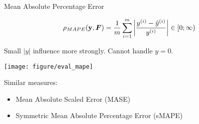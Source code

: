 \documentclass[11pt,compress,t,notes=noshow, xcolor=table]{beamer}
\begin{document}

\begin{vbframe}{Mean Absolute Percentage Error}


$$ 
\rho_{MAPE}(\mathbf{y}, \boldsymbol{F}) = \frac{1}{m} \sum\limits_{i=1}^m \left\rvert \frac{y^{(i)}- \hat{y}^{(i)}}{y^{(i)}} \right\rvert \in [0;\infty) 
$$

\vfill

\begin{minipage}[c]{0.33\textwidth}
  \raggedright
  \small
  
Small $|y|$ influence more strongly. Cannot handle $y=0$.
\end{minipage}%
\begin{minipage}[c]{0.67\textwidth}
  \begin{knitrout}\scriptsize
  \color{fgcolor}
  {\texttt{[image: figure/eval\_mape]}}
\end{knitrout}
\end{minipage}

\vfill

\small
Similar measures:

\begin{itemize}
  \small
  \item Mean Absolute Scaled Error (MASE)
  \item Symmetric Mean Absolute Percentage Error (sMAPE)
\end{itemize}

\end{vbframe}

\end{document}
